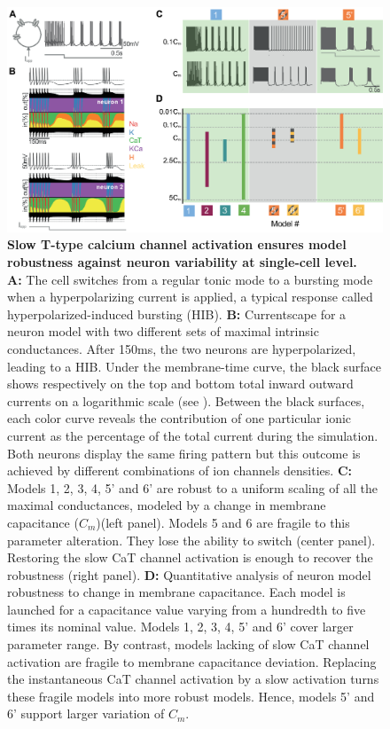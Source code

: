 \begin{figure}[h!]
\includegraphics[scale=0.95]{fig/Plos/Fig1}
\caption{ {\bf Slow T-type calcium channel activation ensures model robustness against neuron variability at single-cell level. } \\
\textbf{A:} The cell switches from a regular tonic mode to a bursting mode when a hyperpolarizing current is applied, a typical response called hyperpolarized-induced bursting (HIB). \textbf{B:} Currentscape for a neuron model with two different sets of maximal intrinsic conductances. After 150ms, the two neurons are hyperpolarized, leading to a HIB. Under the membrane-time curve, the black surface shows respectively on the top and bottom total inward outward currents on a logarithmic scale (see \citep{alonso_visualization_2019}). Between the black surfaces, each color curve  reveals the contribution of one particular ionic current as the percentage of the total current during the simulation. Both neurons display the same firing pattern but this outcome is achieved by different combinations of ion channels densities. \textbf{C:} Models 1, 2, 3, 4, 5' and 6' are robust to a uniform scaling of all the maximal conductances, modeled by a change in membrane capacitance ($C_m$)(left panel). Models 5 and 6 are fragile to this parameter alteration. They lose the ability to switch (center panel). Restoring the slow CaT channel activation is enough to recover the robustness (right panel). \textbf{D:} Quantitative analysis of neuron model robustness to change in membrane capacitance. Each model is launched for a capacitance value varying from a hundredth to five times its nominal value. Models 1, 2, 3, 4, 5' and 6' cover larger parameter range. By contrast,  models lacking of slow CaT channel activation are fragile to membrane capacitance deviation. Replacing the instantaneous CaT channel activation by a slow activation turns these fragile models into more robust models. Hence, models 5' and 6' support larger variation of $C_m$. }
\label{fig:1}
\end{figure}



